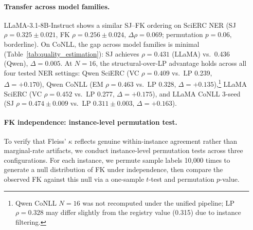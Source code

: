 \paragraph{Transfer across model families.}
LLaMA-3.1-8B-Instruct shows a similar SJ--FK ordering on SciERC NER (SJ $\rho{=}0.325{\pm}0.021$, FK $\rho{=}0.256{\pm}0.024$, $\Delta\rho{=}0.069$; permutation $p{=}0.06$, borderline).
On CoNLL, the gap across model families is minimal (Table~\ref{tab:quality_estimation}): SJ achieves $\rho{=}0.431$ (LLaMA) vs.\ 0.436 (Qwen), $\Delta{=}0.005$.
At $N{=}16$, the structural-over-LP advantage holds across all four tested NER settings: Qwen SciERC (VC $\rho{=}0.409$ vs.\ LP 0.239, $\Delta{=}{+}0.170$), Qwen CoNLL (EM $\rho{=}0.463$ vs.\ LP 0.328, $\Delta{=}{+}0.135$),\footnote{Qwen CoNLL $N{=}16$ was not recomputed under the unified pipeline; LP $\rho{=}0.328$ may differ slightly from the registry value (0.315) due to instance filtering.} LLaMA SciERC (VC $\rho{=}0.452$ vs.\ LP 0.277, $\Delta{=}{+}0.175$), and LLaMA CoNLL 3-seed (SJ $\rho{=}0.474{\pm}0.009$ vs.\ LP $0.311{\pm}0.003$, $\Delta{=}{+}0.163$).

\paragraph{FK independence: instance-level permutation test.}\label{app:fk_independence}

To verify that Fleiss' $\kappa$ reflects genuine within-instance agreement rather than marginal-rate artifacts, we conduct instance-level permutation tests across three configurations.
For each instance, we permute sample labels 10{,}000 times to generate a null distribution of FK under independence, then compare the observed FK against this null via a one-sample $t$-test and permutation $p$-value.

\begin{table}[t]
\centering
\small
\caption{Instance-level FK independence test. Permutation tests confirm FK reflects true within-instance agreement (all $p{<}0.001$). Split-half reliability $r$ computed by randomly partitioning $N$ samples into two halves and correlating their FK scores.}
\label{tab:fk_independence}
\end{table}

